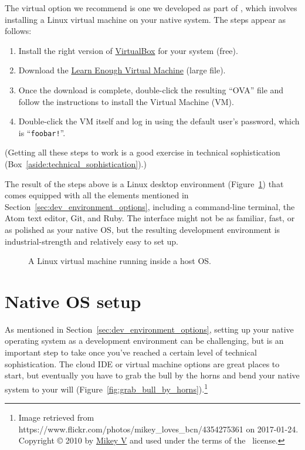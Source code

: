 The virtual option we recommend is one we developed as part of \lecl, which involves installing a Linux virtual machine on your native system. The steps appear as follows:

\begin{enumerate}
\item Install the right version of \href{https://www.virtualbox.org/}{VirtualBox} for your system (free).
\item Download the \href{https://softcover-static.s3.amazonaws.com/LearnEnough-v.1.4.ova}{Learn Enough Virtual Machine} (large file).
\item Once the download is complete, double-click the resulting ``OVA'' file and follow the instructions to install the Virtual Machine (VM).
\item Double-click the VM itself and log in using the default user's password, which is ``\texttt{foobar!}''.
\end{enumerate}
(Getting all these steps to work is a good exercise in technical sophistication (Box~\ref{aside:technical_sophistication}).)

The result of the steps above is a Linux desktop environment (Figure~\ref{fig:virtual_machine}) that comes equipped with all the elements mentioned in Section~\ref{sec:dev_environment_options}, including a command-line terminal, the Atom text editor, Git, and Ruby. The interface might not be as familiar, fast, or as polished as your native OS, but the resulting development environment is industrial-strength and relatively easy to set up.

\begin{figure}
\begin{center}
\end{center}
\caption{A Linux virtual machine running inside a host OS.\label{fig:virtual_machine}}
\end{figure}



\section{Native OS setup} %
\label{sec:native_os_setup}

As mentioned in Section~\ref{sec:dev_environment_options}, setting up your native operating system as a development environment can be challenging, but is an important step to take once you've reached a certain level of technical sophistication. The cloud IDE or virtual machine options are great places to start, but eventually you have to grab the bull by the horns and bend your native system to your will (Figure~\ref{fig:grab_bull_by_horns}).\footnote{Image retrieved from https://www.flickr.com/photos/mikey_loves_bcn/4354275361 on 2017-01-24. Copyright © 2010 by \href{https://www.flickr.com/photos/mikey_loves_bcn/}{Mikey V} and used under the terms of the \ccbync\ license.}

